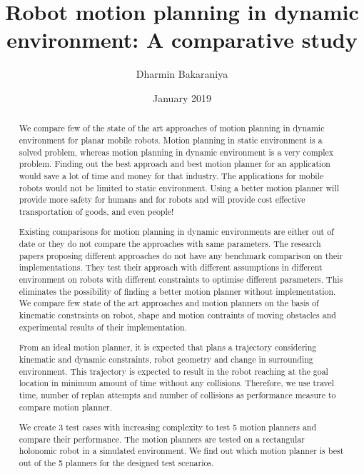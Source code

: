 \documentclass[thesis]{mas_report}
\author{Dharmin Bakaraniya}
\title{Robot motion planning in dynamic environment: A comparative study}
\date{January 2019}
\begin{document}
\begin{titlepage}
    \maketitle
\end{titlepage}


\pagestyle{plain}


\cleardoublepage{}
\statementpage{}

\begin{abstract}

We compare few of the state of the art approaches of motion planning in dynamic environment for
planar mobile robots.
Motion planning in static environment is a solved problem, whereas motion
planning in dynamic environment is a very complex problem. Finding out the best approach and best 
motion planner for an application would save a lot of time and money for that industry. The applications
for mobile robots would not be limited to static environment. Using a better motion planner will 
provide more safety for humans and for robots and will provide cost effective transportation of goods,
and even people!

Existing comparisons for motion planning in dynamic environments are either out of date or they do 
not compare the approaches with same parameters. The research papers proposing different approaches
do not have any benchmark comparison on their implementations. They test their approach with different 
assumptions in different environment on robots with different constraints to optimise different 
parameters. This eliminates the possibility of finding a better motion planner without implementation.
We compare few state of the art approaches
and motion planners on the basis of kinematic constraints on robot, shape and motion contraints of 
moving obstacles and experimental results of their implementation.

From an ideal motion planner, it is 
expected that plans a trajectory considering kinematic and dynamic constraints, robot geometry and
change in surrounding environment. This trajectory is expected to result in the robot reaching 
at the goal location in minimum amount of time without any collisions. Therefore, we use travel time, number of
replan attempts and number of collisions as performance measure to compare motion planner.

We create 3 test cases with increasing complexity to test 5 motion planners and compare their performance.
The motion planners are tested on a rectangular holonomic robot in a simulated environment. We find
out which motion planner is best out of the 5 planners for the designed test scenarios.

\end{abstract}
\end{document}
